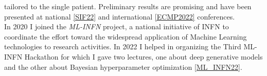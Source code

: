 \begin{cvcontent}
  tailored to the single patient. Preliminary results are promising and
  have been presented at national \hyperlink{sif-2022}{[SIF22]} and 
  international \hyperlink{ecmp-2022}{[ECMP2022]} conferences.
  \\ [1.5mm]
  In 2020 I joined the \emph{ML-INFN} project, a national initiative 
  of INFN to coordinate the effort toward the widespread application 
  of Machine Learning technologies to research activities. In 2022 I 
  helped in organizing the Third ML-INFN Hackathon for which I gave
  two lectures, one about deep generative models and the other about
  Bayesian hyperparameter optimization \hyperlink{mlinfn-2022}{[ML\_INFN22]}.
\end{cvcontent}